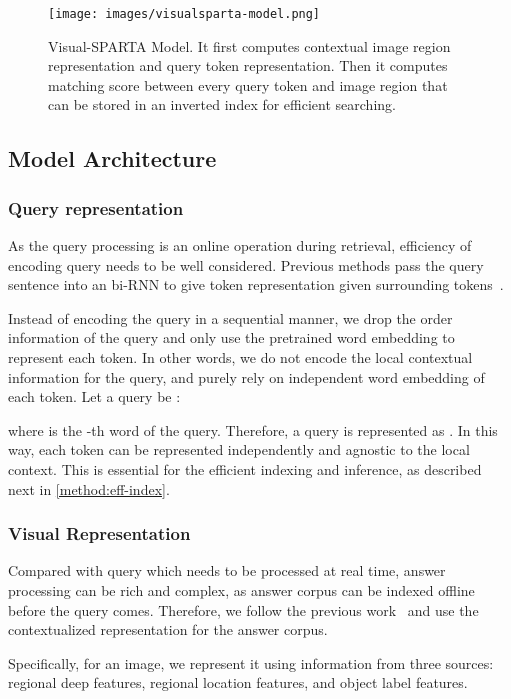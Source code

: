 \documentclass[11pt,a4paper]{article}
\begin{document}
\begin{figure*}[ht]
\centering
\texttt{[image: images/visualsparta-model.png]}
\caption{Visual-SPARTA Model. It first computes contextual image region representation and query token representation. Then it computes matching score between every query token and image region that can be stored in an inverted index for efficient searching.}
\label{fig:visualsparta-model}
\end{figure*}


\subsection{Model Architecture}
\subsubsection{Query representation}
As the query processing is an online operation during retrieval, efficiency of encoding query needs to be well considered. Previous methods pass the query sentence into an bi-RNN to give token representation given surrounding tokens~\cite{lee2018stacked,wang2019position,wang2020consensus}. 

Instead of encoding the query in a sequential manner, we drop the order information of the query and only use the pretrained word embedding to represent each token. In other words, we do not encode the local contextual information for the query, and purely rely on independent word embedding  of each token. Let a query be :


where  is the -th word of the query. Therefore, a query is represented as 
. In this way, each token can be represented independently and agnostic to the local context. This is essential for the efficient indexing and inference, as described next in \ref{method:eff-index}.

\subsubsection{Visual Representation}
Compared with query which needs to be processed at real time, answer processing can be rich and complex, as answer corpus can be indexed offline before the query comes. Therefore, we follow the previous work~\cite{li2020oscar} and use the contextualized representation for the answer corpus.

Specifically, for an image, we represent it using information from three sources: regional deep features, regional location features, and object label features. 
\end{document}

